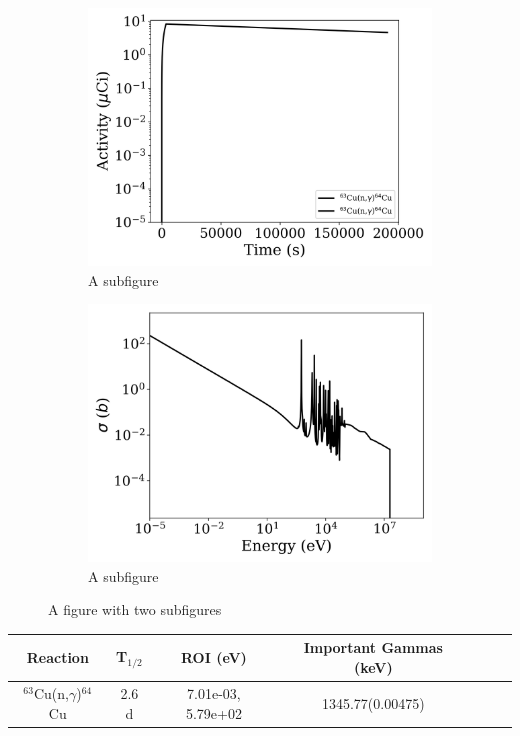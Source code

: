 \begin{figure}[h]
\centering
\begin{subfigure}{.5\textwidth}
  \centering
     \includegraphics[width=.8\textwidth]{plot/Cu-63(n,gamma)Cu-64_library1} 

  \caption{A subfigure}
  \label{fig:sub1}
\end{subfigure}%
\begin{subfigure}{.5\textwidth}
  \centering
     \includegraphics[width=.8\textwidth]{plot/Cu-63(n,gamma)Cu-64} 

  \caption{A subfigure}
  \label{fig:sub2}
\end{subfigure}
\caption{A figure with two subfigures}
\label{fig:test}
\end{figure}

\begin{table}[h]
\centering
\begin{tabular}{ |c|c|c|c|c|c|c| }
 \hline
 Reaction & T$_{1/2}$ & ROI (eV) & Important Gammas (keV) \\
 \hline 
 $^{63}$Cu(n,$\gamma$)$^{64}$Cu &  2.6 d & 7.01e-03, 5.79e+02 & 1345.77(0.00475) \\ 
\hline
\end{tabular}
\end{table}
